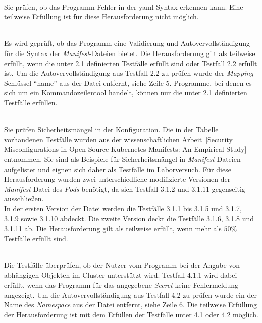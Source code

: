 \begin{description}
    \setlength\itemsep{-0.5cm}
    \item[Testfälle für Herausforderung 1]{~\\}
          Sie prüfen, ob das Programm Fehler in der \ac{yaml}-Syntax erkennen kann.
          Eine teilweise Erfüllung ist für diese Herausforderung nicht möglich.
    \item[Testfälle für Herausforderung 2]{~\\}
          Es wird geprüft, ob das Programm eine Validierung und Autovervollständigung für die Syntax der \textit{Manifest}-Dateien
          bietet. Die Herausforderung gilt als teilweise erfüllt, wenn die unter 2.1 definierten Testfälle erfüllt sind oder Testfall 2.2 erfüllt ist.
          Um die Autovervollständigung aus Testfall 2.2 zu prüfen wurde der \textit{Mapping}-Schlüssel ``name'' aus der Datei entfernt, siehe Zeile 5.
          Programme, bei denen es sich um ein Kommandozeilentool handelt, können nur die unter 2.1 definierten Testfälle erfüllen.
    \item[Testfälle für Herausforderung 3]{~\\}
          Sie prüfen Sicherheitsmängel in der Konfiguration. Die in der Tabelle vorhandenen Testfälle wurden
          aus der wissenschaftlichen Arbeit~\cite{10.1145/3579639}[Security Misconfigurations in Open Source Kubernetes Manifests: An Empirical Study]
          entnommen. Sie sind als Beispiele für Sicherheitsmängel in \textit{Manifest}-Dateien aufgelistet und eignen sich daher als Testfälle im Laborversuch.
          Für diese Herausforderung wurden zwei unterschiedliche modifizierte Versionen der \textit{Manifest}-Datei des \textit{Pods} benötigt,
          da sich Testfall 3.1.2 und 3.1.11 gegenseitig ausschließen.
          \\
          In der ersten Version der Datei werden die Testfälle 3.1.1 bis 3.1.5 und 3.1.7, 3.1.9 sowie 3.1.10 abdeckt.
          Die zweite Version deckt die Testfälle 3.1.6, 3.1.8 und 3.1.11 ab.
          Die Herausforderung gilt als teilweise erfüllt, wenn mehr als $50\%$ Testfälle erfüllt sind.

    \item[Testfälle für Herausforderung 4]{~\\}
          Die Testfälle überprüfen, ob der Nutzer vom Programm bei der Angabe von abhängigen Objekten im Cluster unterstützt wird.
          Testfall 4.1.1 wird dabei erfüllt, wenn das Programm für das angegebene \textit{Secret} keine Fehlermeldung angezeigt.
          Um die Autovervollständigung aus Testfall 4.2 zu prüfen wurde ein der Name des \textit{Namespace} aus der Datei entfernt, siehe Zeile 6.
          Die teilweise Erfüllung der Herausforderung ist mit dem Erfüllen der Testfälle unter 4.1 oder 4.2 möglich.
\end{description}

